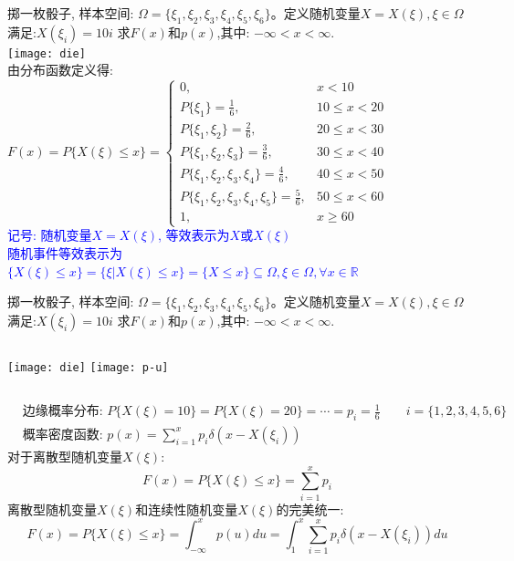 \begin{frame}[shrink]
\small
掷一枚骰子, 样本空间: $\Omega=\{\xi_1,\xi_2,\xi_3,\xi_4,\xi_5,\xi_6\}$。定义随机变量$X=X(\xi),\xi\in \Omega$满足:$X(\xi_i)=10i$
求$F(x)$和$p(x)$,其中: $-\infty<x<\infty$.\\
\texttt{[image: die]}\\
由分布函数定义得: 
$F(x)=P\{X(\xi)\le x\} =
\begin{cases}
0,      & x<10 \\
P\{\xi_1 \}=\frac{1}{6}, & 10\le x<20 \\
P\{\xi_1,\xi_2 \}=\frac{2}{6}, & 20\le x<30 \\
P\{\xi_1,\xi_2,\xi_3 \}=\frac{3}{6}, & 30\le x<40 \\
P\{\xi_1,\xi_2,\xi_3,\xi_4 \}=\frac{4}{6}, & 40\le x<50 \\
P\{\xi_1,\xi_2,\xi_3,\xi_4,\xi_5 \}=\frac{5}{6}, & 50\le x<60 \\
1,      & x\ge 60
\end{cases} $\\
\textcolor{blue}{记号: 随机变量$X=X(\xi)$, 等效表示为$X$或$X(\xi)$}\\ 
\textcolor{blue}{随机事件等效表示为$\{X(\xi)\le x\}=\{\xi|X(\xi)\le x \}=\{X \le x\}\subseteq\Omega, \xi\in\Omega, \forall x\in\mathbb{R}$}
\end{frame}

\begin{frame}[shrink]
掷一枚骰子, 样本空间: $\Omega=\{\xi_1,\xi_2,\xi_3,\xi_4,\xi_5,\xi_6\}$。定义随机变量$X=X(\xi),\xi\in \Omega$满足:$X(\xi_i)=10i$
求$F(x)$和$p(x)$,其中: $-\infty<x<\infty$.\\
\begin{columns}
	\texttt{[image: die]}
	\texttt{[image: p-u]}
\end{columns}

\begin{align*}
&\text{边缘概率分布: } P\{X(\xi)=10\}=P\{X(\xi)=20\}=\cdots=p_i=\frac{1}{6} \qquad i=\{1,2,3,4,5,6\}\\
&\text{概率密度函数: } p(x)=\sum_{i=1}^{x}p_i\delta(x-X(\xi_i)) 
\end{align*}
对于离散型随机变量$X(\xi)$: 
\[ F(x)=P\{X(\xi)\le x \}=\sum\limits_{i=1}^{x}p_i \]
离散型随机变量$X(\xi)$和连续性随机变量$X(\xi)$的完美统一:
\[ F(x)=P\{X(\xi)\le x\}=\int_{-\infty}^{x}p(u)du=\int_{1}^{x}\sum\limits_{i=1}^{x}p_i\delta(x-X(\xi_i))du \]
\end{frame}

